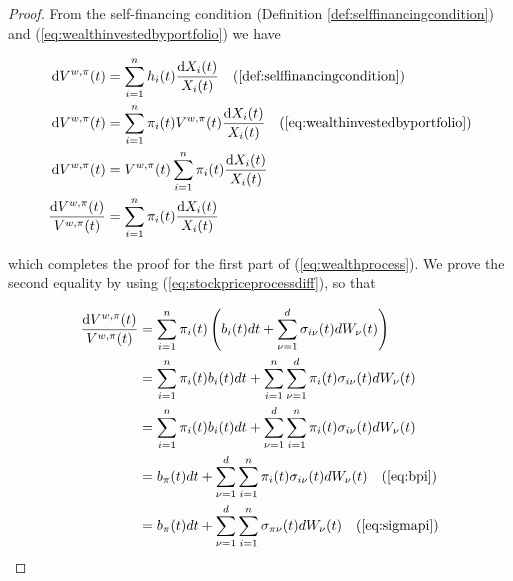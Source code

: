 \documentclass[british]{amsart}
\numberwithin{equation}{section}
\numberwithin{figure}{section}
\theoremstyle{plain}
\theoremstyle{definition}
\theoremstyle{plain}
\theoremstyle{plain}
\theoremstyle{plain}
\theoremstyle{remark}
\theoremstyle{plain}
\renewcommand{\d}[1]{\mathop{\mathrm{d}{#1}}}
\begin{document}
\begin{proof}

  From the self-financing condition (Definition
\ref{def:selffinancingcondition}) and (\ref{eq:wealthinvestedbyportfolio}) we
have

  \begin{gather*} \begin{split} \d{V^{w,\pi}(t)} &= \sum_{i=1}^{n} h_{i}(t)
\frac{\d{X_{i}(t)}}{X_{i}(t)} \quad (\ref{def:selffinancingcondition}) \\
\d{V^{w,\pi}(t)} &= \sum_{i=1}^{n} \pi_{i}(t)V^{w,\pi}(t)
\frac{\d{X_{i}(t)}}{X_{i}(t)} \quad (\ref{eq:wealthinvestedbyportfolio}) \\
\d{V^{w,\pi}(t)} &= V^{w,\pi}(t) \sum_{i=1}^{n} \pi_{i}(t)
\frac{\d{X_{i}(t)}}{X_{i}(t)} \\ \frac{\d{V^{w,\pi}(t)}}{V^{w,\pi}(t)} &=
\sum_{i=1}^{n} \pi_{i}(t) \frac{\d{X_{i}(t)}}{X_{i}(t)} \\ \end{split}
\end{gather*}

  which completes the proof for the first part of (\ref{eq:wealthprocess}). We
prove the second equality by using (\ref{eq:stockpriceprocessdiff}), so that

  \begin{gather*} \begin{split} \frac{\d{V^{w,\pi}(t)}}{V^{w,\pi}(t)} & =
\sum_{i=1}^{n} \pi_{i}(t) \left( b_{i}(t)dt + \sum_{\nu=1}^{d} \sigma_{i\nu}(t)
dW_{\nu}(t) \right) \\ & = \sum_{i=1}^{n} \pi_{i}(t) b_{i}(t)dt + \sum_{i=1}^{n}
\sum_{\nu=1}^{d} \pi_{i}(t) \sigma_{i\nu}(t) dW_{\nu}(t) \\ & = \sum_{i=1}^{n}
\pi_{i}(t) b_{i}(t)dt + \sum_{\nu=1}^{d} \sum_{i=1}^{n} \pi_{i}(t)
\sigma_{i\nu}(t) dW_{\nu}(t) \\ & = b_{\pi}(t)dt + \sum_{\nu=1}^{d}
\sum_{i=1}^{n} \pi_{i}(t) \sigma_{i\nu}(t) dW_{\nu}(t) \quad (\ref{eq:bpi}) \\ &
= b_{\pi}(t)dt + \sum_{\nu=1}^{d} \sum_{i=1}^{n} \sigma_{\pi\nu}(t) dW_{\nu}(t)
\quad (\ref{eq:sigmapi}) \\ \end{split} \end{gather*}

\end{proof}
\end{document}
